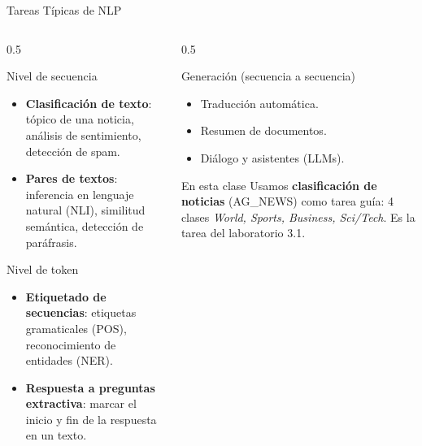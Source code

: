 \documentclass[aspectratio=169, 10pt]{beamer}
\begin{document}
\begin{frame}{Tareas T\'ipicas de NLP}

	\begin{columns}[T]
		\begin{column}{0.5\textwidth}
			\begin{block}{Nivel de secuencia}
				\small
				\begin{itemize}
					\item \textbf{Clasificaci\'on de texto}: t\'opico de una noticia, an\'alisis de sentimiento, detecci\'on de spam.
					\item \textbf{Pares de textos}: inferencia en lenguaje natural (NLI), similitud sem\'antica, detecci\'on de par\'afrasis.
				\end{itemize}
			\end{block}

			\begin{block}{Nivel de token}
				\small
				\begin{itemize}
					\item \textbf{Etiquetado de secuencias}: etiquetas gramaticales (POS), reconocimiento de entidades (NER).
					\item \textbf{Respuesta a preguntas extractiva}: marcar el inicio y fin de la respuesta en un texto.
				\end{itemize}
			\end{block}
		\end{column}

		\begin{column}{0.5\textwidth}
			\begin{block}{Generaci\'on (secuencia a secuencia)}
				\small
				\begin{itemize}
					\item Traducci\'on autom\'atica.
					\item Resumen de documentos.
					\item Di\'alogo y asistentes (LLMs).
				\end{itemize}
			\end{block}

			\vspace{0.2cm}

			\begin{alertblock}{En esta clase}
				\small
				Usamos \textbf{clasificaci\'on de noticias} (AG\_NEWS) como tarea gu\'ia: 4 clases \emph{World, Sports, Business, Sci/Tech}. Es la tarea del laboratorio 3.1.
			\end{alertblock}
		\end{column}
	\end{columns}

\end{frame}
\end{document}
